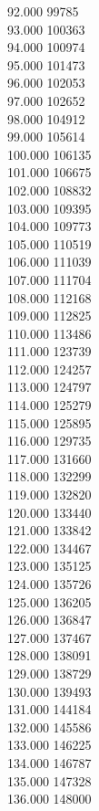 { 92.000	99785 \\
 93.000	100363 \\
 94.000	100974 \\
 95.000	101473 \\
 96.000	102053 \\
 97.000	102652 \\
 98.000	104912 \\
 99.000	105614 \\
 100.000	106135 \\
 101.000	106675 \\
 102.000	108832 \\
 103.000	109395 \\
 104.000	109773 \\
 105.000	110519 \\
 106.000	111039 \\
 107.000	111704 \\
 108.000	112168 \\
 109.000	112825 \\
 110.000	113486 \\
 111.000	123739 \\
 112.000	124257 \\
 113.000	124797 \\
 114.000	125279 \\
 115.000	125895 \\
 116.000	129735 \\
 117.000	131660 \\
 118.000	132299 \\
 119.000	132820 \\
 120.000	133440 \\
 121.000	133842 \\
 122.000	134467 \\
 123.000	135125 \\
 124.000	135726 \\
 125.000	136205 \\
 126.000	136847 \\
 127.000	137467 \\
 128.000	138091 \\
 129.000	138729 \\
 130.000	139493 \\
 131.000	144184 \\
 132.000	145586 \\
 133.000	146225 \\
 134.000	146787 \\
 135.000	147328 \\
 136.000	148000 \\
}
